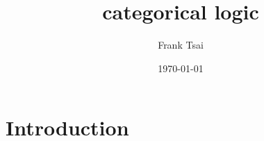 \documentclass[article,10pt,oneside]{memoir}
\title{categorical logic}
\author{Frank Tsai}
\date{\today}
\begin{document}
\maketitle
\tableofcontents

\section{Introduction}
\label{sec:introduction}





\end{document}
